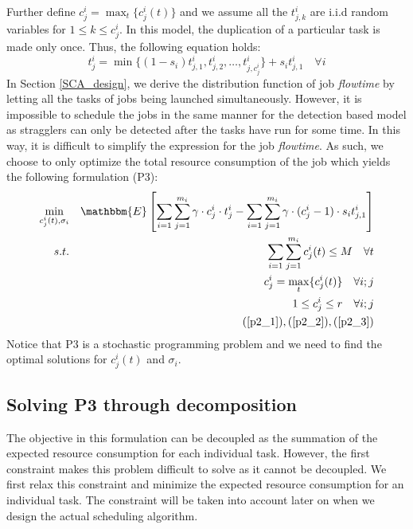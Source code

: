 \documentclass[10pt,conference]{IEEEtran}
\begin{document}
 Further define $c^i_j = \max_{t}\{c^i_j(t)\}$ and we assume all the $t^{i}_{j,k}$ are i.i.d random variables for $1\leq k \leq c^i_{j}$. In this model, the duplication of a particular task is made only once. Thus, the following equation holds:
\begin{equation}
 \label{p2_3}
 t^i_j = \min \{ (1 - s_i) t^i_{j,1},  t^i_{j,2}, \dots, t^i_{j,c^i_j} \} + s_i t^i_{j,1} \quad \forall i
\end{equation}
In Section \ref{SCA_design}, we derive the distribution function of job \textit{flowtime} by letting all the tasks of jobs being launched simultaneously. However, it is impossible to schedule the jobs in the same manner for the detection based model as stragglers can only be detected after the tasks have run for some time. In this way, it is difficult to simplify the expression for the job \textit{flowtime}. As such,  we choose to only optimize the total resource consumption of the job which yields the following formulation (P3):
\begin{eqnarray*}
\min_{c^i_j(t),\sigma_i}  &  &   \mathbbm{E} \left[ \sum_{i = 1}  \sum_{j=1}^{m_i} \gamma \cdot c^i_j \cdot t^i_j - \sum_{i = 1}  \sum_{j=1}^{m_i} \gamma  \cdot (c^i_j - 1) \cdot s_i t^i_{j,1} \right]\\
s.t.  &  & \sum_{i = 1} \sum_{j=1}^{m_i}c^i_j(t) \leq M \quad \forall t\\
  &  & c^i_j = \max_{t}\{c^i_j(t)\} \quad \forall i; j \\
  &  & 1 \leq c^i_j \leq r \quad \forall i; j\\
  &  & (\ref{p2_1}), (\ref{p2_2}), (\ref{p2_3})
\end{eqnarray*}
Notice that P3 is a stochastic programming problem and we need to find the optimal solutions for $c^i_j(t)$ and $\sigma_i$.

\subsection{Solving P3 through decomposition}
The objective in this formulation can be decoupled as the summation of the expected resource consumption for each individual task. However, the first constraint makes this problem difficult to solve as it cannot be decoupled. We first relax this constraint and minimize the expected resource consumption for an individual task. The constraint will be taken into account later on when we design the actual scheduling algorithm.
\end{document}
